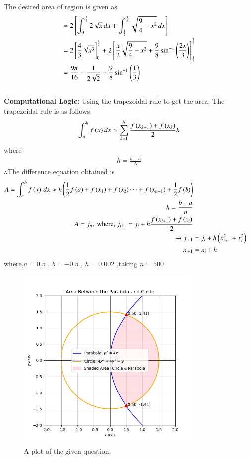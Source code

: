 \documentclass[journal]{IEEEtran}
\numberwithin{equation}{enumi}
\numberwithin{figure}{enumi}
\begin{document}
	The desired area of region is given as\\
	\begin{align*}
		&= 2{}\left[\int_{0}^{\frac{1}{2}} 2\sqrt{x} \, dx + \int_{\frac{1}{2}}^{\frac{3}{2}} \sqrt{\frac{9}{4}-x^2} \, dx\right]\\
		&= 2{}\left[\frac{4}{3}\sqrt{x^3}\right]_0^\frac{1}{2} + 2{}\left[\frac{x}{2}\sqrt{\frac{9}{4}-x^2} + \frac{9}{8}\sin^{-1}\left(\frac{2x}{3}\right)\right]_\frac{1}{2}^\frac{3}{2}\\
		&= \frac{9\pi}{16}-\frac{1}{2\sqrt{2}}-\frac{9}{8}\sin^{-1}\left(\frac{1}{3}\right)
	\end{align*}\\
	
\textbf{Computational Logic:} 
Using the trapezoidal rule to get the area. The trapezoidal rule is as follows.
\begin{align}
    \int^{b}_{a} f\left(x\right)dx\approx \sum^{N}_{k=1}\frac{f\left(x_{k+1}\right)+f\left(x_{k}\right)}{2}h
\end{align}
where
\begin{align}
    h=\frac{b-a}{N}
\end{align}
$\therefore$The difference equation obtained is\\
\begin{align}
A = \int_a^b f\left(x\right)\, dx \approx h\left(\frac{1}{2}f\left(a\right) + f\left(x_1\right) + f\left(x_2\right) \cdots + f\left(x_{n-1}\right) + \frac{1}{2}f\left(b\right)\right)\\
h = \frac{b-a}{n}\\
A = j_n, \text{ where, } j_{i + 1} = j_i + h\frac{f\left(x_{i+1}\right) + f\left(x_i\right)}{2}\\ 
\xrightarrow{} j_{i + 1} &= j_i + h\left({x_{i+1}^2}+{x_{i}^2}\right)\\
x_{i+1} &= x_i + h\\
\end{align}	
where,$a=0.5$ , $b=-0.5$ , $h=0.002$ ,taking $n=500$
	
	\begin{figure}[ht]
		\centering
		\includegraphics[width=0.8\textwidth]{figs/fig.png}
		\caption{A plot of the given question.}
	\end{figure}
\end{document}
